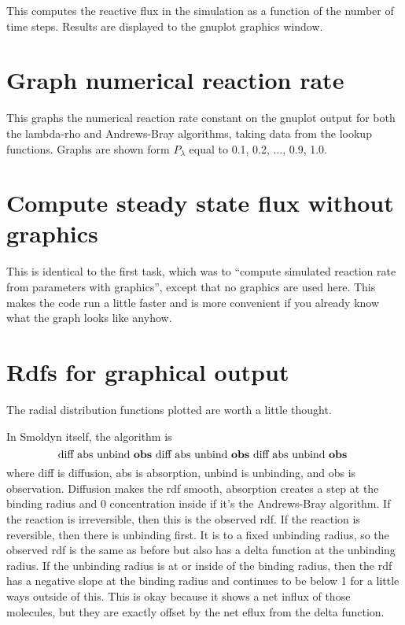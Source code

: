 \documentclass {book}
\begin{document}
This computes the reactive flux in the simulation as a function of the number of time steps. Results are displayed to the gnuplot graphics window.

\section{Graph numerical reaction rate}

This graphs the numerical reaction rate constant on the gnuplot output for both the lambda-rho and Andrews-Bray algorithms, taking data from the lookup functions. Graphs are shown form $P_\lambda$ equal to 0.1, 0.2, ..., 0.9, 1.0.

\section{Compute steady state flux without graphics}

This is identical to the first task, which was to ``compute simulated reaction rate from parameters with graphics'', except that no graphics are used here. This makes the code run a little faster and is more convenient if you already know what the graph looks like anyhow.

\section{Rdfs for graphical output}

The radial distribution functions plotted are worth a little thought.

In Smoldyn itself, the algorithm is
$$\textrm{diff abs unbind \textbf{obs} diff abs unbind \textbf{obs} diff abs unbind \textbf{obs} }$$
where diff is diffusion, abs is absorption, unbind is unbinding, and obs is observation. Diffusion makes the rdf smooth, absorption creates a step at the binding radius and 0 concentration inside if it's the Andrews-Bray algorithm. If the reaction is irreversible, then this is the observed rdf. If the reaction is reversible, then there is unbinding first. It is to a fixed unbinding radius, so the observed rdf is the same as before but also has a delta function at the unbinding radius. If the unbinding radius is at or inside of the binding radius, then the rdf has a negative slope at the binding radius and continues to be below 1 for a little ways outside of this. This is okay because it shows a net influx of those molecules, but they are exactly offset by the net eflux from the delta function.
\end{document}
